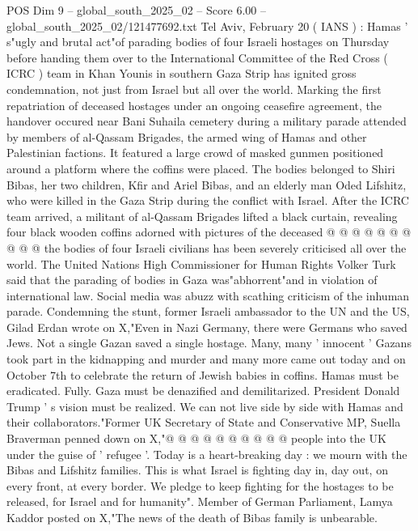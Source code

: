 \begin{textsample}{POS Dim 9 – global\_south\_2025\_02 – Score 6.00 – global\_south\_2025\_02/121477692.txt}  \label{ex:f9_pos_394}
Tel Aviv, February 20 ( IANS ) : Hamas ' s"ugly and brutal act"of parading bodies of four Israeli hostages on Thursday before handing them over to the International Committee of the Red Cross ( ICRC ) team in Khan Younis in southern Gaza Strip has ignited gross condemnation, not just from Israel but all over the world.
Marking the first repatriation of deceased hostages under an ongoing ceasefire agreement, the handover occured near Bani Suhaila cemetery during a military parade attended by members of al-Qassam Brigades, the armed wing of Hamas and other Palestinian factions.
It featured a large crowd of masked gunmen positioned around a platform where the coffins were placed.
The bodies belonged to Shiri Bibas, her two children, Kfir and Ariel Bibas, and an elderly man Oded Lifshitz, who were killed in the Gaza Strip during the conflict with Israel.
After the ICRC team arrived, a militant of al-Qassam Brigades lifted a black curtain, revealing four black wooden coffins adorned with pictures of the deceased @ @ @ @ @ @ @ @ @ @ the bodies of four Israeli civilians has been severely criticised all over the world.
The United Nations High Commissioner for Human Rights Volker Turk said that the parading of bodies in Gaza was"abhorrent"and in violation of international law.
Social media was abuzz with scathing criticism of the inhuman parade.
Condemning the stunt, former Israeli ambassador to the UN and the US, Gilad Erdan wrote on X,"Even in Nazi Germany, there were Germans who saved Jews.
Not a single Gazan saved a single hostage.
Many, many ' innocent ' Gazans took part in the kidnapping and murder and many more came out today and on October 7th to celebrate the return of Jewish babies in coffins.
Hamas must be eradicated.
Fully.
Gaza must be denazified and demilitarized.
President Donald Trump ' s vision must be realized.
We can not live side by side with Hamas and their collaborators."Former UK Secretary of State and Conservative MP, Suella Braverman penned down on X,"@ @ @ @ @ @ @ @ @ @ people into the UK under the guise of ' refugee '.
Today is a heart-breaking day : we mourn with the Bibas and Lifshitz families.
This is what Israel is fighting day in, day out, on every front, at every border.
We pledge to keep fighting for the hostages to be released, for Israel and for humanity".
Member of German Parliament, Lamya Kaddor posted on X,"The news of the death of Bibas family is unbearable.

\end{textsample}
